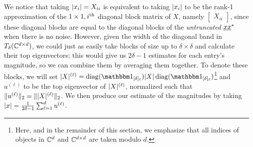 We notice that taking $\lvert x_i\rvert = X_{ii}$ is equivalent to taking $\lvert x_i\rvert$ to be the rank-1 approximation of the $1 \times 1, i^{\text{th}}$ diagonal block matrix of $X$, namely $\begin{bmatrix} X_{ii} \end{bmatrix}$, since these diagonal blocks are equal to the diagonal blocks of the \emph{untruncated} $\underline{x} \underline{x}^*$ when there is no noise.  However, given the width of the diagonal band in $T_\delta(\mathbb{C}^{d \times d})$, we could just as easily take blocks of size up to $\delta \times \delta$ and calculate their top eigenvectors; this would give us $2 \delta - 1$ estimates for each entry's magnitude, so we can combine them by averaging them together.  %
To denote these blocks, we will set $\abs{X}^{(\ell)} = \diag(\one_{[\delta]_\ell}) \abs{X} \diag(\one_{[\delta]_\ell})$\footnote{Here, and in the remainder of this section, we emphasize that all indices of objects in $\mathbb{C}^d$ and $\mathbb{C}^{d \times d}$ are taken modulo $d$.} and $u^{(\ell)}$ to be the top eigenvector of $\lvert X\rvert^{(\ell)}$, normalized such that $\lVert u^{(\ell)}\rVert_2 = \lVert\lvert X\rvert^{(\ell)}\rVert_2$.  We then produce our estimate of the magnitudes by taking $\lvert x\rvert = \frac{1}{2 \delta - 1} \sum_{\ell = 1}^d u^{(\ell)}$.  

